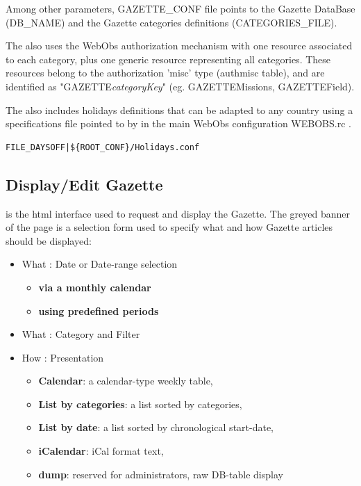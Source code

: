 

Among other parameters, GAZETTE\_CONF file points to the Gazette DataBase (DB\_NAME)
and the Gazette categories definitions (CATEGORIES\_FILE).

The  also uses the WebObs authorization mechanism with one resource associated to each 
category, plus one generic resource representing all categories. These resources
belong to the authorization 'misc' type (authmisc table), and are identified as  
"GAZETTE\textit{categoryKey}"  (eg. GAZETTEMissions, GAZETTEField). 




The  also includes holidays definitions that can be adapted to any country using 
a specifications file pointed to by  in the main WebObs configuration WEBOBS.rc .

\begin{lstlisting}[title=\wofile{WEBOBS.rc} (excerpt)]
FILE_DAYSOFF|${ROOT_CONF}/Holidays.conf
\end{lstlisting}



\subsection{Display/Edit Gazette}

 is the html interface used to request and display the Gazette. 
The greyed banner of the page is a selection form used to specify what and how Gazette articles should
be displayed: 
\begin{itemize}
\item What : Date or Date-range selection 
	\begin{itemize}
	\item \textbf{via a monthly calendar}
	\item \textbf{using predefined periods}
	\end{itemize}
\item What : Category and Filter
\item How : Presentation
	\begin{itemize}
	\item \textbf{Calendar}: a calendar-type weekly table,
	\item \textbf{List by categories}: a list sorted by categories,
	\item \textbf{List by date}: a list sorted by chronological start-date,
	\item \textbf{iCalendar}: iCal format text,
	\item \textbf{dump}: reserved for administrators, raw DB-table display
	\end{itemize}
\end{itemize}

